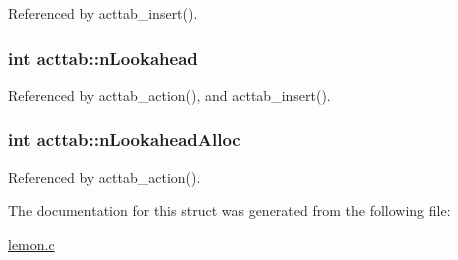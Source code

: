 Referenced by acttab\-\_\-insert().

\hypertarget{structacttab_ab4063b892cd8c9c11ae0a91630bc2ca2}{
\subsubsection[{n\-Lookahead}]{\setlength{\rightskip}{0pt plus 5cm}int acttab\-::n\-Lookahead}}\label{structacttab_ab4063b892cd8c9c11ae0a91630bc2ca2}


Referenced by acttab\-\_\-action(), and acttab\-\_\-insert().

\hypertarget{structacttab_aa776f649f69a622f6be07eaf538c700a}{
\subsubsection[{n\-Lookahead\-Alloc}]{\setlength{\rightskip}{0pt plus 5cm}int acttab\-::n\-Lookahead\-Alloc}}\label{structacttab_aa776f649f69a622f6be07eaf538c700a}


Referenced by acttab\-\_\-action().



The documentation for this struct was generated from the following file\-:\begin{DoxyCompactItemize}
\item 
\hyperlink{lemon_8c}{lemon.\-c}\end{DoxyCompactItemize}
